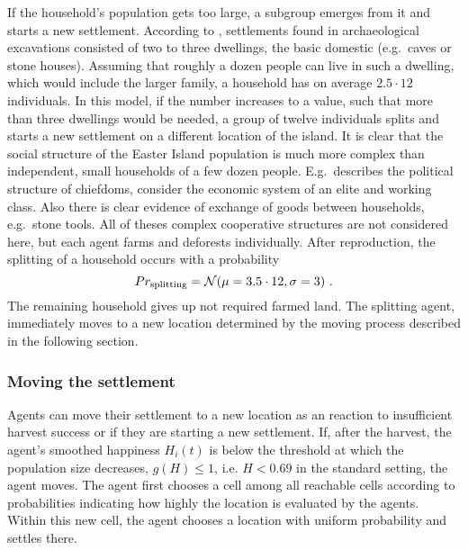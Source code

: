 If the household's population gets too large, a subgroup emerges from it and starts a new settlement.
According to \citet{Bahn2017}, settlements found in archaeological excavations consisted of two to three dwellings, the basic domestic (e.g.\ caves or stone houses). 
Assuming that roughly a dozen people can live in such a dwelling, which would include the larger family, a household has on average $2.5\cdot 12$ individuals.
In this model, if the number increases to a value, such that more than three dwellings would be needed, a group of twelve individuals splits and starts a new settlement on a different location of the island. 
It is clear that the social structure of the Easter Island population is much more complex than independent, small households of a few dozen people. 
E.g.\ \citet{Cauwe}\TODO describes the political structure of chiefdoms, \citet{Puleston2017} consider the economic system of an elite and working class.
Also there is clear evidence of exchange of goods between households, e.g.\ stone tools.
All of theses complex cooperative structures are not considered here, but each agent farms and deforests individually.
After reproduction, the splitting of a household occurs with a probability 
\begin{equation}
Pr_{\rm splitting} = \mathcal{N}( \mu = 3.5 \cdot 12, \sigma = 3)\ .
\end{equation}
The remaining household gives up not required farmed land.
The splitting agent, immediately moves to a new location determined by the moving process described in the following section.

\subsubsection{Moving the settlement}
Agents can move their settlement to a new location as an reaction to insufficient harvest success or if they are starting a new settlement.
If, after the harvest, the agent's smoothed happiness $H_i(t)$ is below the threshold at which the population size decreases, $g(H)\leq 1$, i.e. $H<0.69$ in the standard setting, the agent moves.
The agent first chooses a cell among all reachable cells according to probabilities indicating how highly the location is evaluated by the agents.
Within this new cell, the agent chooses a location with uniform probability and settles there.

